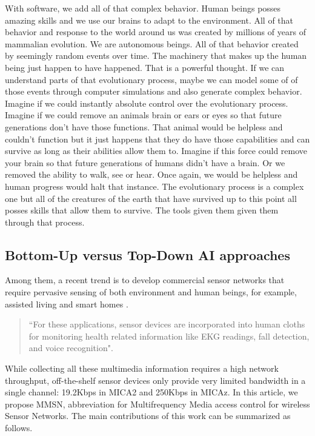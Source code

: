 With software, we add all of that complex behavior.  Human beings posses amazing
skills and we use our brains to adapt to the environment.   All of that behavior
and response to the world around us was created by millions of years of mammalian evolution.  We are autonomous beings.  All of that
behavior created by seemingly random events over time.   The machinery that
makes up the human being just happen to have happened.  That is a powerful
thought.  If we can understand parts of that evolutionary process, maybe we can
model some of of those events through computer simulations and also generate
complex behavior.  Imagine if we could instantly absolute control over the
evolutionary process. Imagine if we could remove an animals brain or ears or eyes so that future
generations don't have those functions.  That animal would be helpless and
couldn't function but it just happens that they do have those capabilities and
can survive as long as their abilities allow them to.  Imagine if this force
could remove your brain so that future generations of humans didn't have a brain.  Or we removed the ability to walk, see or hear. 
Once again, we would be helpless and human progress would halt that instance.
The evolutionary process is a complex one but all of the creatures of the earth
that have survived up to this point all posses skills that allow them to
survive. The tools given them given them through that process.

\subsection{Bottom-Up versus Top-Down AI approaches}

Among them, a recent trend is to develop
commercial sensor networks that require pervasive sensing of both
environment and human beings, for example, assisted living
\cite{Akyildiz-02,Harvard-01,CROSSBOW} and smart homes
\cite{Harvard-01,Adya-01,CROSSBOW}.

\begin{quote}
``For these applications, sensor devices are incorporated into human
cloths \cite{Natarajan-01,Zhou-06,Bahl-02,Adya-01} for monitoring
health related information like EKG readings, fall detection, and voice recognition".
\end{quote}
While collecting all these multimedia information
\cite{Akyildiz-02} requires a high network throughput, off-the-shelf
sensor devices only provide very limited bandwidth in a single
channel: 19.2Kbps in MICA2 \cite{Bahl-02} and 250Kbps in MICAz.
In this article, we propose MMSN, abbreviation for Multifrequency
Media access control for wireless Sensor Networks. The main
contributions of this work can be summarized as follows.